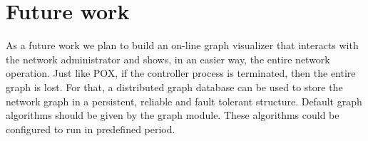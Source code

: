 \section{Future work}
\label{sec:future}

As a future work we plan to build an on-line graph visualizer 
that interacts with the network administrator and shows, in 
an easier way, the entire network operation.
Just like POX, if the controller process is terminated, then the
entire graph is lost.
For that, a distributed graph database can be used to store
the network graph in a persistent, reliable and fault tolerant
structure.
Default graph algorithms should be given by the graph module. 
These algorithms could be configured to run in predefined 
period.